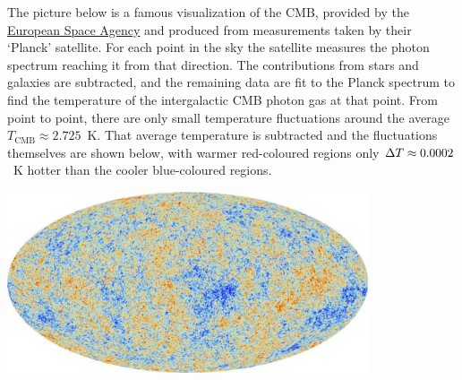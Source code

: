 The picture below is a famous visualization of the CMB, provided by the \href{http://www.esa.int/ESA_Multimedia/Images/2013/03/Planck_CMB}{European Space Agency} and produced from measurements taken by their `Planck' satellite. %
For each point in the sky the satellite measures the photon spectrum reaching it from that direction.
The contributions from stars and galaxies are subtracted, and the remaining data are fit to the Planck spectrum to find the temperature of the intergalactic CMB photon gas at that point.
From point to point, there are only small temperature fluctuations around the average $T_{\text{CMB}} \approx 2.725$~K.
That average temperature is subtracted and the fluctuations themselves are shown below, with warmer red-coloured regions only $\Delta T \approx 0.0002$~K hotter than the cooler blue-coloured regions. \\[-24 pt]
\begin{center}\includegraphics[width=0.8\textwidth]{figs/unit08_CMB.pdf}\end{center}

